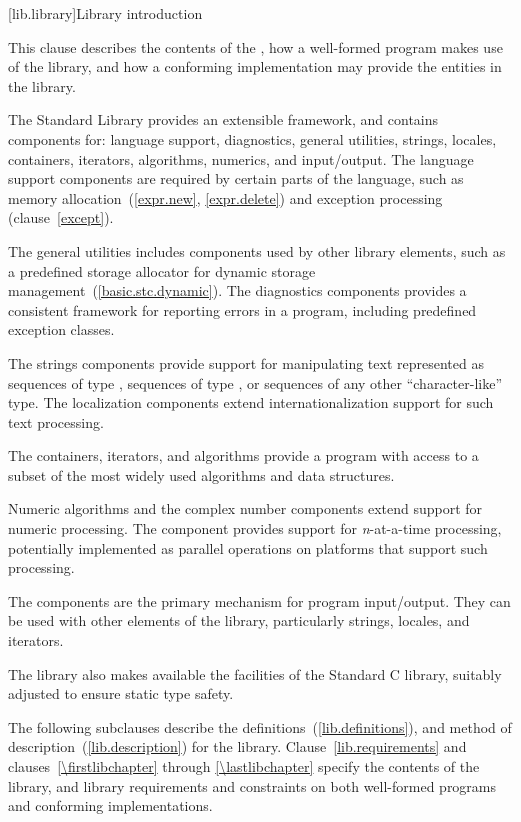 [lib.library]{Library introduction}

\pnum
This clause describes the contents of the
,
%
how a well-formed \Cpp program makes use of the library, and
how a conforming implementation may provide the entities in the library.

\pnum
The \Cpp Standard Library provides an extensible framework, and contains
components for: language support, diagnostics, general utilities, strings,
locales, containers, iterators, algorithms, numerics, and input/output.
The language support components are required by certain parts of the \Cpp
language, such as memory allocation~(\ref{expr.new}, \ref{expr.delete})
and exception processing (clause~\ref{except}).

\pnum
The general utilities includes components used
by other library elements, such as a predefined storage allocator for dynamic
storage management~(\ref{basic.stc.dynamic}).
The diagnostics components provides a consistent framework for
reporting errors in a \Cpp program, including predefined exception classes.

\pnum
The strings components provide support for manipulating text represented 
as sequences of type , sequences of type ,
or sequences of any other ``character-like'' type.
The localization components extend internationalization
support for such text processing.

\pnum
The containers, iterators, and algorithms provide a \Cpp program with access
to a subset of the most widely used algorithms and data structures.

\pnum
Numeric algorithms and the complex number components extend support for numeric processing.
The
component provides support for
\textit{n}-at-a-time
processing,
potentially implemented as parallel operations on platforms that support such processing.

\pnum
The
components are the primary mechanism for \Cpp program input/output.
They can be used with other elements of the library, particularly
strings, locales, and iterators.

\pnum
The library also makes available the facilities of the Standard C library,
%
suitably adjusted to ensure static type safety.

\pnum
The following subclauses describe the definitions~(\ref{lib.definitions}),
and method of description~(\ref{lib.description}) for the library.
Clause~\ref{lib.requirements} and clauses~\ref{\firstlibchapter} through
\ref{\lastlibchapter} specify the contents of the library, and library
requirements and constraints on both well-formed \Cpp programs and
conforming implementations.

